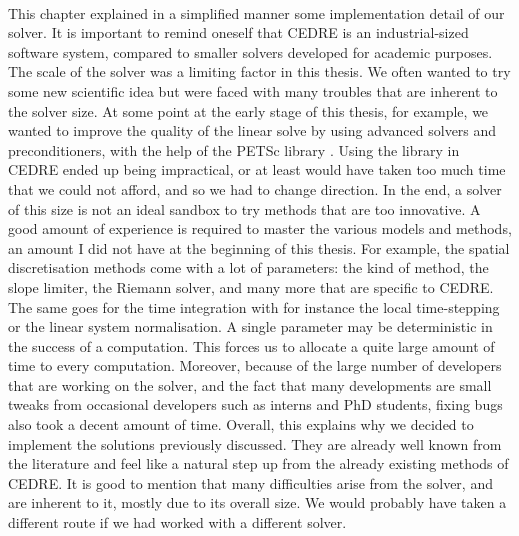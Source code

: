   \paragraph{}
  This chapter explained in a simplified manner some implementation detail of our solver.
  It is important to remind oneself that CEDRE is an industrial-sized software system, compared to smaller solvers developed for academic purposes.
  The scale of the solver was a limiting factor in this thesis.
  We often wanted to try some new scientific idea but were faced with many troubles that are inherent to the solver size.
  At some point at the early stage of this thesis, for example, we wanted to improve the quality of the linear solve by using advanced solvers and preconditioners, with the help of the PETSc library \cite{petsc-web-page, petsc-user-ref, petsc-efficient}.
  Using the library in CEDRE ended up being impractical, or at least would have taken too much time that we could not afford, and so we had to change direction.
  In the end, a solver of this size is not an ideal sandbox to try methods that are too innovative.
  A good amount of experience is required to master the various models and methods, an amount I did not have at the beginning of this thesis.
  For example, the spatial discretisation methods come with a lot of parameters: the kind of method, the slope limiter, the Riemann solver, and many more that are specific to CEDRE.
  The same goes for the time integration with for instance the local time-stepping or the linear system normalisation.
  A single parameter may be deterministic in the success of a computation.
  This forces us to allocate a quite large amount of time to every computation.
  Moreover, because of the large number of developers that are working on the solver, and the fact that many developments are small tweaks from occasional developers such as interns and PhD students, fixing bugs also took a decent amount of time.
  Overall, this explains why we decided to implement the solutions previously discussed.
  They are already well known from the literature and feel like a natural step up from the already existing methods of CEDRE.
  It is good to mention that many difficulties arise from the solver, and are inherent to it, mostly due to its overall size.
  We would probably have taken a different route if we had worked with a different solver.


  \pagebreak
